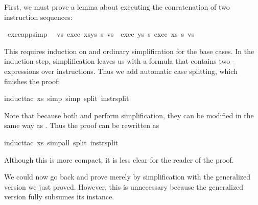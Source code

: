 \begin{isabellebody}
\begin{isamarkuptxt}
First, we must prove a lemma about executing the concatenation of two
instruction sequences:%
\end{isamarkuptxt}%
\isamarkuptrue%
%
\endisatagproof
{\isafoldproof}%
%
\isadelimproof
%
\endisadelimproof
{}\isamarkupfalse%
\ exec{\isacharunderscore}app{\isacharbrackleft}simp{\isacharbrackright}{\isacharcolon}\isanewline
\ \ {\isachardoublequoteopen}{\isasymforall}vs{\isachardot}\ exec\ {\isacharparenleft}xs{\isacharat}ys{\isacharparenright}\ s\ vs\ {\isacharequal}\ exec\ ys\ s\ {\isacharparenleft}exec\ xs\ s\ vs{\isacharparenright}{\isachardoublequoteclose}%
\isadelimproof
%
\endisadelimproof
%
\isatagproof
%
\begin{isamarkuptxt}%
\noindent
This requires induction on  and ordinary simplification for the
base cases. In the induction step, simplification leaves us with a formula
that contains two -expressions over instructions. Thus we add
automatic case splitting, which finishes the proof:%
\end{isamarkuptxt}%
\isamarkuptrue%
\isamarkupfalse%
{\isacharparenleft}induct{\isacharunderscore}tac\ xs{\isacharcomma}\ simp{\isacharcomma}\ simp\ split{\isacharcolon}\ instr{\isachardot}split{\isacharparenright}%
\endisatagproof
{\isafoldproof}%
%
\isadelimproof
%
\endisadelimproof
%
\begin{isamarkuptext}%
\noindent
Note that because both  and  perform simplification, they can
be modified in the same way as .  Thus the proof can be
rewritten as%
\end{isamarkuptext}%
\isamarkuptrue%
%
\isadelimproof
%
\endisadelimproof
%
\isatagproof
{}\isamarkupfalse%
{\isacharparenleft}induct{\isacharunderscore}tac\ xs{\isacharcomma}\ simp{\isacharunderscore}all\ split{\isacharcolon}\ instr{\isachardot}split{\isacharparenright}%
\endisatagproof
{\isafoldproof}%
%
\isadelimproof
%
\endisadelimproof
%
\begin{isamarkuptext}%
\noindent
Although this is more compact, it is less clear for the reader of the proof.

We could now go back and prove 
merely by simplification with the generalized version we just proved.
However, this is unnecessary because the generalized version fully subsumes
its instance.%
%
\end{isamarkuptext}%
\isamarkuptrue%
%
\isadelimproof
%
\endisadelimproof
%
\isatagproof
%
\endisatagproof
{\isafoldproof}%
%
\isadelimproof
%
\endisadelimproof
%
\isadelimtheory
%
\endisadelimtheory
%
\isatagtheory
%
\endisatagtheory
{\isafoldtheory}%
%
\isadelimtheory
%
\endisadelimtheory
\end{isabellebody}%
